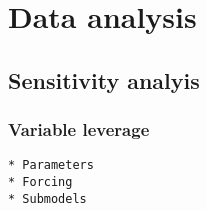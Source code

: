 \chapter{Data analysis}\label{data-analysis}

\section{Sensitivity analyis}\label{sensitivity-analyis}

\subsection{Variable leverage}\label{variable-leverage}

\begin{verbatim}
* Parameters
* Forcing 
* Submodels
\end{verbatim}
